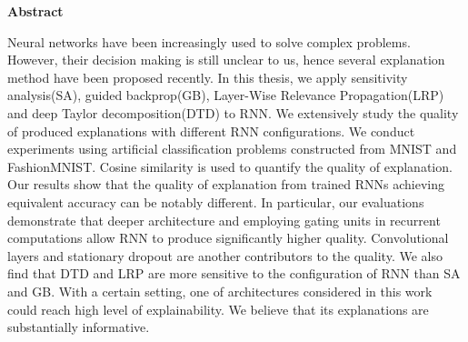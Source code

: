 \thispagestyle{empty}
\vspace*{1.0cm}

\begin{center}
    \textbf{Abstract}
\end{center}

\vspace*{0.5cm}

\noindent

Neural networks have been increasingly used to solve complex problems. However, their decision making is still unclear to us, hence several explanation method have been proposed recently. In this thesis, we apply sensitivity analysis(SA), guided backprop(GB), Layer-Wise Relevance Propagation(LRP) and deep Taylor decomposition(DTD) to RNN. We extensively study the quality of produced explanations with different RNN configurations. We conduct experiments using artificial classification problems constructed from MNIST and FashionMNIST. Cosine similarity is used to quantify the quality of explanation. Our results show that the quality of explanation from trained RNNs achieving equivalent accuracy can be notably different. In particular, our evaluations demonstrate that deeper architecture and employing gating units in recurrent computations allow RNN to produce significantly higher quality.  Convolutional layers and stationary dropout are another contributors to the quality. We also find that DTD and LRP are more sensitive to the configuration of RNN than SA and GB. With a certain setting, one of architectures considered in this work could reach high level of explainability. We believe that its explanations are substantially informative.

%
%
%
%
